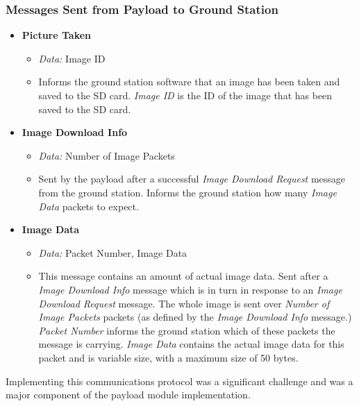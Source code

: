 \subsubsection*{Messages Sent from Payload to Ground Station}

\begin{itemize}

\item \textbf{Picture Taken}

\begin{itemize}
\item \emph{Data:} Image ID

\item Informs the ground station software that an image has been taken and 
saved to the SD card. \emph{Image ID} is the ID of the image that has been 
saved to the SD card.
\end{itemize} 

\item \textbf{Image Download Info}

\begin{itemize}

\item \emph{Data:} Number of Image Packets

\item Sent by the payload after a successful \emph{Image Download Request}
message from the ground station. Informs the ground station how many 
\emph{Image Data} packets to expect.
\end{itemize}

\item \textbf{Image Data} 
\begin{itemize}
\item \emph{Data:} Packet Number, Image Data
\item This message contains an amount of actual image data. Sent after a
\emph{Image Download Info} message which is in turn in response to an 
\emph{Image Download Request} message. The whole image is sent over
\emph{Number of Image Packets} packets (as defined by the \emph{Image Download
Info} message.) \emph{Packet Number} informs the ground station which of these
packets the message is carrying. \emph{Image Data} contains the actual image 
data for this packet and is variable size, with a maximum size of 50 bytes. 
\end{itemize}

\end{itemize}

Implementing this communications protocol was a significant challenge and was a major
component of the payload module implementation. 

